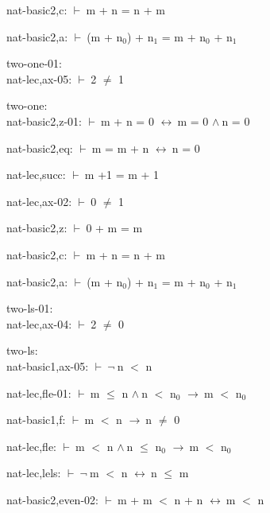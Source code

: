 \documentclass[a4paper]{article}
\newcommand{\Fol}{\mbox{$\vdash\ $}}
\newcommand{\Not}{\mbox{$\neg\ $}}
\newcommand{\And}{\mbox{$\wedge\ $}}
\newcommand{\Imp}{\mbox{$\rightarrow\ $}}
\newcommand{\Equiv}{\mbox{$\leftrightarrow\ $}}
\begin{document}
nat-basic2,c: 
 \Fol m + n = n + m



nat-basic2,a: 
 \Fol (m + $\mbox{n}_{0}$) + $\mbox{n}_{1}$ = m + $\mbox{n}_{0}$ + $\mbox{n}_{1}$



\bigskip

two-one-01:\\ nat-lec,ax-05: 
 \Fol 2 $\neq$ 1



\bigskip

two-one:\\ nat-basic2,z-01: 
 \Fol m + n = 0 \Equiv m = 0 \And n = 0



nat-basic2,eq: 
 \Fol m = m + n \Equiv n = 0



nat-lec,succ: 
 \Fol m +1 = m + 1



nat-lec,ax-02: 
 \Fol 0 $\neq$ 1



nat-basic2,z: 
 \Fol 0 + m = m



nat-basic2,c: 
 \Fol m + n = n + m



nat-basic2,a: 
 \Fol (m + $\mbox{n}_{0}$) + $\mbox{n}_{1}$ = m + $\mbox{n}_{0}$ + $\mbox{n}_{1}$



\bigskip

two-ls-01:\\ nat-lec,ax-04: 
 \Fol 2 $\neq$ 0



\bigskip

two-ls:\\ nat-basic1,ax-05: 
 \Fol \Not n $<$ n



nat-lec,fle-01: 
 \Fol m $\le$ n \And n $<$ $\mbox{n}_{0}$ \Imp m $<$ $\mbox{n}_{0}$



nat-basic1,f: 
 \Fol m $<$ n \Imp n $\neq$ 0



nat-lec,fle: 
 \Fol m $<$ n \And n $\le$ $\mbox{n}_{0}$ \Imp m $<$ $\mbox{n}_{0}$



nat-lec,lels: 
 \Fol \Not m $<$ n \Equiv n $\le$ m



nat-basic2,even-02: 
 \Fol m + m $<$ n + n \Equiv m $<$ n
\end{document}
